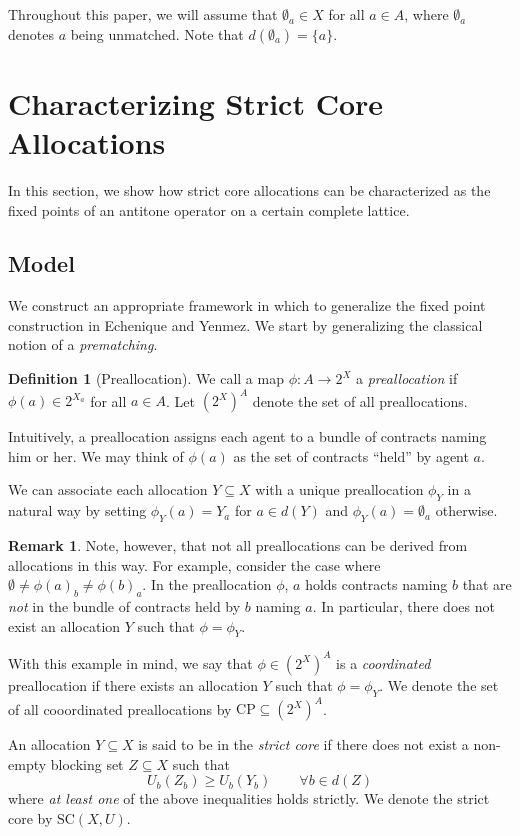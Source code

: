 \documentclass[11pt,reqno]{amsart}
\theoremstyle{definition}
\newtheorem{defn}[thm]{Definition}
\newtheorem{remark}[thm]{Remark}
\numberwithin{equation}{section}
\newcommand{\pre}{\phi}
\newcommand{\coordpre}{\mathrm{CP}}
\newcommand{\prealloc}{(2^X)^A}
\newcommand{\sub}{\subseteq}
\newcommand{\strcore}{\mathrm{SC}(X,U)}
\begin{document}
Throughout this paper, we will assume that $\emptyset_a \in X$ for all $a \in A$, where $\emptyset_a$ denotes $a$ being unmatched. Note that $d(\emptyset_a) = \{a\}$. 

\section{Characterizing Strict Core Allocations} \label{section:strcore}
In this section, we show how strict core allocations can be characterized as the fixed points of an antitone operator on a certain complete lattice.

\subsection{Model}
We construct an appropriate framework in which to generalize the fixed point construction in Echenique and Yenmez. 
We start by generalizing the classical notion of a \emph{prematching}. 

\begin{defn}[Preallocation] We call a map $\pre: A \to 2^X$ a \emph{preallocation} if $\pre(a) \in 2^{X_a}$ for all $a\in A$. Let $(2^X)^A$ denote the set of all preallocations.  
\end{defn}

Intuitively, a preallocation assigns each agent to a bundle of contracts naming him or her. We may think of $\pre(a)$ as the set of contracts ``held'' by agent $a$.   

We can associate each allocation $Y\subseteq X$ with a unique preallocation $\pre_Y$ in a natural way by setting $\pre_Y(a) = Y_a$ for $a \in d(Y)$ and $\pre_Y(a) = \emptyset_a$ otherwise.
\begin{remark} Note, however, that not all preallocations can be derived from allocations in this way.
For example, consider the case where $\emptyset \not = \pre(a)_b \not = \pre(b)_a$. In the preallocation $\pre$, $a$ holds contracts naming $b$ that are \emph{not} in the bundle of contracts held by $b$ naming $a$.  
In particular, there does not exist an allocation $Y$ such that $\pre = \pre_Y$. 
\end{remark}

With this example in mind, we say that $\pre \in \prealloc$ is a \emph{coordinated} preallocation if there exists an allocation $Y$ such that $\pre = \pre_Y$. 
We denote the set of all cooordinated preallocations by $\coordpre\sub \prealloc$.

An allocation $Y \sub X$ is said to be in the \emph{strict core} if there does not exist a non-empty blocking set $Z \sub X$ such that 
\[
U_b(Z_b) \geq U_b(Y_b) \qquad  \forall b\in d(Z)
\]
where \emph{at least one} of the above inequalities holds strictly.
We denote the strict core by $\strcore$. 
\end{document}
